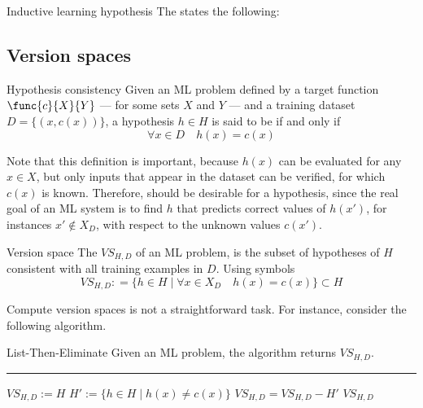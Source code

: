 \documentclass[a4paper, 12pt]{report}
\begin{document}
    \begin{frameddefn}{Inductive learning hypothesis}
        The  states the following: 
    \end{frameddefn}

    \subsection{Version spaces}

    \begin{frameddefn}{Hypothesis consistency}
        Given an ML problem defined by a target function $\func{c}{X}{Y}$ --- for some sets $X$ and $Y$ --- and a training dataset $D = \{(x, c(x))\}$, a hypothesis $h \in H$ is said to be  if and only if $$\forall x \in D \quad h(x) = c(x)$$
    \end{frameddefn}

    Note that this definition is important, because $h(x)$ can be evaluated for any $x \in X$, but only inputs that appear in the dataset can be verified, for which $c(x)$ is known. Therefore,  should be desirable for a hypothesis, since the real goal of an ML system is to find  $h$ that predicts correct values of $h(x')$, for instances $x' \notin X_D$, with respect to the unknown values $c(x')$.

    \begin{frameddefn}{Version space}
        The  $VS_{H, D}$ of an ML problem, is the subset of hypotheses of $H$ consistent with all training examples in $D$. Using symbols $$VS_{H, D}: = \{h \in H \mid \forall x \in X_D \quad h(x) = c(x)\} \subset H$$
    \end{frameddefn}

    Compute version spaces is not a straightforward task. For instance, consider the following algorithm.

    \begin{framedalgo}{List-Then-Eliminate}
        Given an ML problem, the algorithm returns $VS_{H, D}$. \\
        \hrule
        \quad
        \label{alg:lte}
        \begin{algorithmic}[1]
                \State $VS_{H, D} := H$ 
                    \State $H' := \{h \in H \mid h(x) \neq c(x)\}$ 
                    \State $VS_{H, D} = VS_{H, D} - H'$
                \EndFor
                \State {} $VS_{H,D}$
            \EndFunction
        \end{algorithmic}
    \end{framedalgo}
\end{document}
